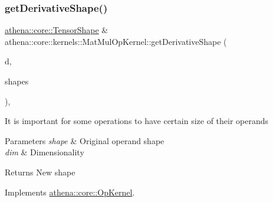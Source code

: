 \mbox{\label{classathena_1_1core_1_1kernels_1_1_mat_mul_op_kernel_aaf7aa2db812b58dedda8ed43d3ea994f}} 
\subsubsection{\texorpdfstring{get\+Derivative\+Shape()}{getDerivativeShape()}}
{\footnotesize\ttfamily \mbox{\hyperlink{classathena_1_1core_1_1_tensor_shape}{athena\+::core\+::\+Tensor\+Shape}} \& athena\+::core\+::kernels\+::\+Mat\+Mul\+Op\+Kernel\+::get\+Derivative\+Shape (\begin{DoxyParamCaption}\item[{int}]{d,  }\item[{const std\+::vector$<$ \mbox{\hyperlink{classathena_1_1core_1_1_tensor_shape}{athena\+::core\+::\+Tensor\+Shape}} \& $>$ \&}]{shapes }\end{DoxyParamCaption})\hspace{0.3cm}{\ttfamily [override]}, {\ttfamily [virtual]}}

It is important for some operations to have certain size of their operands 
\begin{DoxyParams}{Parameters}
{\em shape} & Original operand shape \\
\hline
{\em dim} & Dimensionality \\
\hline
\end{DoxyParams}
\begin{DoxyReturn}{Returns}
New shape 
\end{DoxyReturn}


Implements \mbox{\hyperlink{classathena_1_1core_1_1_op_kernel_aa2367d955810d4e0f3f27b85ae6fe85a}{athena\+::core\+::\+Op\+Kernel}}.

\mbox{\label{classathena_1_1core_1_1kernels_1_1_mat_mul_op_kernel_a75f9e43d1fcecaf9260af31c68cd69db}} 
